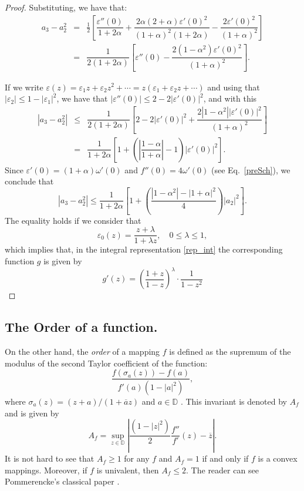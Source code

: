 \documentclass[reqno]{amsart}
\theoremstyle{plain}
\theoremstyle{definition}
\newcommand{\D}{\mathbb{D}}
\begin{document}
\begin{proof}
Substituting, we have that:
\begin{eqnarray*}
a_3-a_2^2 & = & \frac{1}{2}\left[\dfrac{\varepsilon''(0)}{1+2\alpha}+\dfrac{2\alpha(2+\alpha)\varepsilon'(0)^2}{(1+\alpha)^2(1+2\alpha)}-\dfrac{2\varepsilon'(0)^2}{(1+\alpha)^2}\right]\\
& = & \dfrac{1}{2(1+2\alpha)}\left[\varepsilon''(0)-\dfrac{2(1-\alpha^2)\varepsilon'(0)^2}{(1+\alpha)^2}\right].
\end{eqnarray*}

If we write $\varepsilon(z)=\varepsilon_1z+\varepsilon_2z^2+\cdots=z(\varepsilon_1+\varepsilon_2z+\cdots)$ and using that $|\varepsilon_2|\leq1-|\varepsilon_1|^2$, we have that $|\varepsilon''(0)|\leq 2-2|\varepsilon'(0)|^2$, and with this
\begin{eqnarray*}
|a_3-a_2^2| & \leq & \dfrac{1}{2(1+2\alpha)}\left[2-2|\varepsilon'(0)|^2+\dfrac{2|1-\alpha^2||\varepsilon'(0)|^2}{(1+\alpha)^2}\right]\\
& = & \dfrac{1}{1+2\alpha}\left[1+\left(\left|\dfrac{1-\alpha}{1+\alpha}\right|-1\right)|\varepsilon'(0)|^2\right].
\end{eqnarray*}
Since $\varepsilon'(0)=(1+\alpha)\omega'(0)$ and $f''(0)=4\omega'(0)$ (see Eq.~\eqref{preSch}), we conclude that
$$|a_3-a_2^2|\leq \dfrac{1}{1+2\alpha}\left[1+\left(\dfrac{|1-\alpha^2|-|1+\alpha|^2}{4}\right)|a_2|^2\right].$$ The equality holds if we consider that $$\varepsilon_0(z)=\frac{z+\lambda}{1+\lambda z},\quad 0\leq \lambda\leq 1,$$ which implies that, in the integral representation \eqref{rep_int} the corresponding function $g$ is given by $$g'(z)=\left(\dfrac{1+z}{1-z}\right)^\lambda \cdot \dfrac{1}{1-z^2}$$
\end{proof}

\subsection{The Order of a function.} On the other hand, the \textit{order} of a mapping \( f \) is defined as the supremum of the modulus of the second Taylor coefficient of the function:
\[
\frac{f(\sigma_a(z)) - f(a)}{f'(a)(1 - |a|^2)},
\]
where \( \sigma_a(z) = (z + a)/(1 + \overline{a}z) \) and \( a \in \D \) . This invariant is denoted by \( A_f \) and is given by
\begin{equation*}\label{Af} A_f=\sup_{z\in\mathbb{D}}\left|\frac{(1-|z|^2)}{2}\frac{f''}{f'}(z)-\overline{z}\right|.\end{equation*}
It is not hard to see that $A_f\geq 1$ for any $f$ and $A_f=1$ if and only if $f$ is a convex mappings. Moreover, if $f$ is univalent, then $A_f\leq 2$. The reader can see Pommerencke's classical paper \cite{P1964}.
\end{document}
